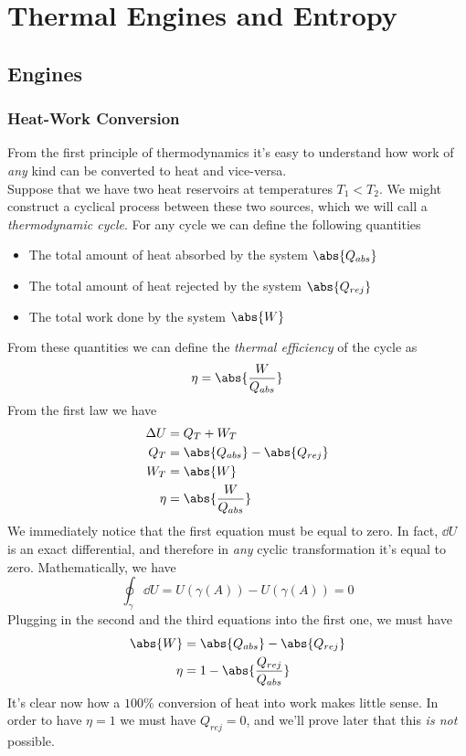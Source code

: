 \documentclass[../qm.tex]{subfiles}
\begin{document}
\chapter{Thermal Engines and Entropy}
\section{Engines}
\subsection{Heat-Work Conversion}
From the first principle of thermodynamics it's easy to understand how work of \textit{any} kind can be converted to heat and vice-versa.\\
Suppose that we have two heat reservoirs at temperatures $T_1<T_2$. We might construct a cyclical process between these two sources, which we will call a \emph{thermodynamic cycle}. For any cycle we can define the following quantities
\begin{itemize}
\item The total amount of heat absorbed by the system $\abs{Q_{abs}}$
\item The total amount of heat rejected by the system $\abs{Q_{rej}}$
\item The total work done by the system $\abs{W}$
\end{itemize}
From these quantities we can define the \textit{thermal efficiency} of the cycle as
\begin{equation}
	\eta=\abs{\frac{W}{Q_{abs}}}
	\label{eq:efficiency.eng}
\end{equation}
From the first law we have 
\begin{equation*}
	\begin{aligned}
		\Delta U&= Q_T+W_T\\
		Q_T&= \abs{Q_{abs}}-\abs{Q_{rej}}\\
		W_T&= \abs{W}\\
		\eta&= \abs{\frac{W}{Q_{abs}}}
	\end{aligned}
\end{equation*}
We immediately notice that the first equation must be equal to zero. In fact, $\dd U$ is an exact differential, and therefore in \textit{any} cyclic transformation it's equal to zero. Mathematically, we have
\begin{equation*}
\oint_\gamma\dd U=U\left( \gamma(A) \right)-U\left( \gamma(A) \right)=0
\end{equation*}
Plugging in the second and the third equations into the first one, we must have
\begin{equation}
	\begin{aligned}
		\abs{W}&= \abs{Q_{abs}}-\abs{Q_{rej}}\\
		\eta&= 1-\abs{\frac{Q_{rej}}{Q_{abs}}}
	\end{aligned}
	\label{eq:etaonlyq.eng}
\end{equation}
It's clear now how a $100\%$ conversion of heat into work makes little sense. In order to have $\eta=1$ we must have $Q_{rej}=0$, and we'll prove later that this \textit{is not} possible.
\end{document}
